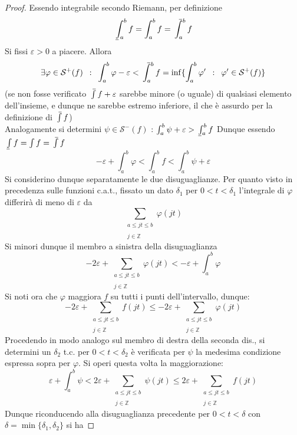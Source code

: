 \documentclass[10pt]{article}
\theoremstyle{plain}
\def\upint{\mathchoice%
    {\mkern13mu\overline{\vphantom{\intop}\mkern7mu}\mkern-20mu}%
    {\mkern7mu\overline{\vphantom{\intop}\mkern7mu}\mkern-14mu}%
    {\mkern7mu\overline{\vphantom{\intop}\mkern7mu}\mkern-14mu}%
    {\mkern7mu\overline{\vphantom{\intop}\mkern7mu}\mkern-14mu}%
  \int}
\def\lowint{\mkern3mu\underline{\vphantom{\intop}\mkern7mu}\mkern-10mu\int}
\begin{document}
\begin{proof}
    Essendo integrabile secondo Riemann, per definizione
    \[\lowint_a^b f = \int_a^b f = \upint_a^b f\]
    Si fissi $\varepsilon > 0$ a piacere. Allora 
    \[\exists \varphi \in \mathcal{S}^+(f) \enspace : \enspace \int_a^b \varphi - \varepsilon < \upint_a^b f = \inf\{\int_a^b \varphi' \enspace : \enspace \varphi' \in \mathcal{S}^+(f)\}\]
    (se non fosse verificato $\upint f + \varepsilon$ sarebbe minore (o uguale) di qualsiasi elemento dell'insieme, e dunque ne sarebbe estremo inferiore, il che è assurdo per la definizione di $\upint f$)
    \\Analogamente si determini $\psi \in \mathcal{S}^-(f)$ :  $\int_a^b \psi + \varepsilon > \lowint_a^b f$
    Dunque essendo $\lowint f = \int f = \upint f$
    \[- \varepsilon + \int_a^b \varphi < \int_a^b f < \int_a^b \psi + \varepsilon\]
    Si considerino dunque separatamente le due disuguaglianze. Per quanto visto in precedenza sulle funzioni c.a.t., fissato un dato $\delta_1$ per $0 < t < \delta_1$ l'integrale di $\varphi$ differirà di meno di $\varepsilon$ da 
    \[\sum_{\substack{a \leq jt \leq b \\~\\ j \in \mathbb{Z}}} \varphi(jt)\]
    Si minori dunque il membro a sinistra della disuguaglianza
    \[- 2 \varepsilon + \sum_{\substack{a \leq jt \leq b \\~\\ j \in \mathbb{Z}}} \varphi(jt) < -\varepsilon + \int_a^b \varphi\]
    Si noti ora che $\varphi$ maggiora $f$ su tutti i punti dell'intervallo, dunque:
    \[- 2 \varepsilon + \sum_{\substack{a \leq jt \leq b \\~\\ j \in \mathbb{Z}}} f(jt) \leq - 2 \varepsilon + \sum_{\substack{a \leq jt \leq b \\~\\ j \in \mathbb{Z}}} \varphi(jt)\]
    Procedendo in modo analogo sul membro di destra della seconda dis., si determini un $\delta_2$ t.c. per $0 < t < \delta_2$ è verificata per $\psi$ la medesima condizione espressa sopra per $\varphi$. Si operi questa volta la maggiorazione:
    \[\varepsilon + \int_a^b \psi < 2 \varepsilon + \sum_{\substack{a \leq jt \leq b \\~\\ j \in \mathbb{Z}}} \psi(jt) \leq 2 \varepsilon + \sum_{\substack{a \leq jt \leq b \\~\\ j \in \mathbb{Z}}} f(jt)\]
    Dunque riconducendo alla disuguaglianza precedente per $0 < t < \delta$ con $\delta = \min\{\delta_1, \delta_2\}$ si ha

\end{proof}
\end{document}

